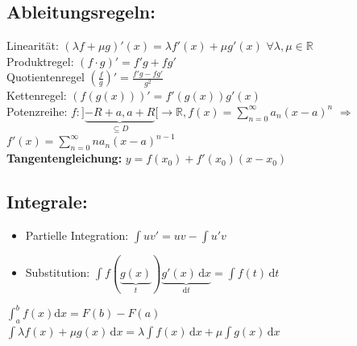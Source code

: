 \documentclass[6pt,a4paper]{scrartcl}
\newcommand{\enbrace}[1]{\ensuremath{\left(#1\right)}}
\begin{document}
\begin{multicols*}{4}
\subsection{Ableitungsregeln:}
Linearität: $(\lambda f + \mu g)' (x) = \lambda f'(x) + \mu g'(x)$ \quad $\forall \lambda, \mu \in \mathbb R$ \\
Produktregel: $(f \cdot g)' = f' g + f g'$\\
Quotientenregel $\enbrace{\frac{f}{g}}' = \frac{f'g - fg'}{g^2}$\\
Kettenregel: $\left( f(g(x)) \right)' = f'(g(x)) g'(x)$\\
Potenzreihe: $f: ] \underbrace{-R+a, a+R}_{\subseteq D}	 [ \rightarrow \mathbb R, f(x) = \sum_{n=0}^{\infty} a_n (x -a)^n$ \quad $\Rightarrow$ \quad $f'(x) = \sum_{n=0}^{\infty} n a_{n} (x-a)^{n-1}$\\
\textbf{Tangentengleichung:} $y=f(x_0)+f'(x_0)(x-x_0)$

\subsection{Integrale:}
\begin{itemize}\itemsep-1pt
\item Partielle Integration: $\int uv'=uv-\int u'v$
\item Substitution: $\int f(\underbrace {g(x)}_{t}) \underbrace {g'(x)\,\mathrm dx}_{\mathrm dt}=\int f(t)\, \mathrm dt$
\end{itemize}

$\int_a^b f(x) \mathrm dx = F(b) - F(a)$\\
$\int\lambda f(x)+\mu g(x) \, \mathrm dx=\lambda\int f(x) \, \mathrm dx + \mu\int g(x) \, \mathrm dx$


\end{multicols*}
\end{document}
